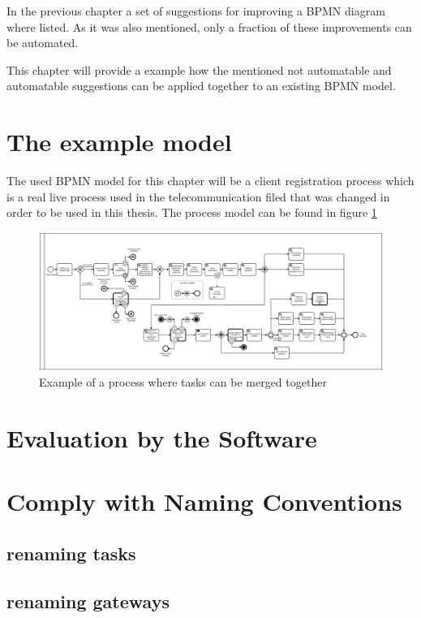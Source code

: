 In the previous chapter a set of suggestions for improving a BPMN diagram where listed. As it was also mentioned, only a fraction of these improvements can be automated. 

This chapter will provide a example how the mentioned not automatable and automatable suggestions can be applied together to an existing BPMN model. 

\section{The example model}
The used BPMN model for this chapter will be a client registration process which is a real live process used in the telecommunication filed that was changed in order to be used in this thesis. The process model can be found in figure \ref{fig:example-process}

\begin{figure}[H]
	\centering
	\includegraphics[width=1.7\columnwidth, angle=90 ]{graphics/process-bpmn.pdf}
	\caption{Example of a process where tasks can be merged together} 
	\label{fig:example-process} 
\end{figure}

\section{Evaluation by the Software}
\section{Comply with Naming Conventions}
\subsection{renaming tasks}
\subsection{renaming gateways}
